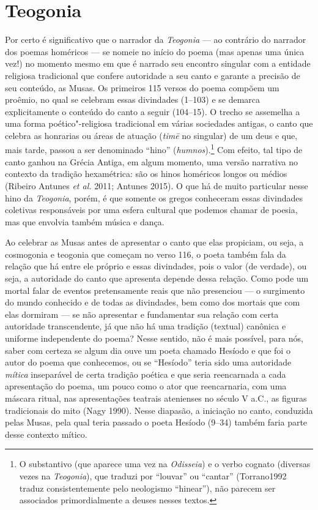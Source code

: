 \section*{Teogonia}


Por certo é significativo que o narrador da \emph{Teogonia} --- ao
contrário do narrador dos poemas homéricos --- se nomeie no início do
poema (mas apenas uma única vez!) no momento mesmo em que é narrado seu
encontro singular com a entidade religiosa tradicional que confere
autoridade a seu canto e garante a precisão de seu conteúdo, as Musas.
Os primeiros 115 versos do poema compõem um proêmio, no qual se celebram
essas divindades (1--103) e se demarca explicitamente o conteúdo do canto
a seguir (104--15). O trecho se assemelha a uma forma poético"-religiosa
tradicional em várias sociedades antigas, o canto que celebra as
honrarias ou áreas de atuação (\emph{timē} no singular) de um deus e
que, mais tarde, passou a ser denominado ``hino''
(\emph{humnos}).\footnote{O substantivo (que aparece uma vez na
  \emph{Odisseia}) e o verbo cognato (diversas vezes na
  \emph{Teogonia}), que traduzi por ``louvar'' ou ``cantar''
  (Torrano1992 traduz consistentemente pelo neologismo ``hinear''), não
  parecem ser associados primordialmente a deuses nesses textos.} Com
efeito, tal tipo de canto ganhou na Grécia Antiga, em algum momento, uma
versão narrativa no contexto da tradição hexamétrica: são os hinos
homéricos longos ou médios (Ribeiro Antunes \emph{et al.} 2011; Antunes
2015). O que há de muito particular nesse hino da \emph{Teogonia},
porém, é que somente os gregos conheceram essas divindades coletivas
responsáveis por uma esfera cultural que podemos chamar de poesia, mas
que envolvia também música e dança.

Ao celebrar as Musas antes de apresentar o canto que elas propiciam, ou
seja, a cosmogonia e teogonia que começam no verso 116, o poeta também
fala da relação que há entre ele próprio e essas divindades, pois o
valor (de verdade), ou seja, a autoridade do canto que apresenta depende
dessa relação. Como pode um mortal falar de eventos pretensamente reais
que não presenciou --- o surgimento do mundo conhecido e de todas as
divindades, bem como dos mortais que com elas dormiram --- se não
apresentar e fundamentar sua relação com certa autoridade transcendente,
já que não há uma tradição (textual) canônica e uniforme independente do
poema? Nesse sentido, não é mais possível, para nós, saber com certeza
se algum dia ouve um poeta chamado Hesíodo e que foi o autor do poema
que conhecemos, ou se ``Hesíodo'' teria sido uma autoridade
\emph{mítica} inseparável de certa tradição poética e que seria
reencarnada a cada apresentação do poema, um pouco como o ator que
reencarnaria, com uma máscara ritual, nas apresentações teatrais
atenienses no século V a.C., as figuras tradicionais do mito (Nagy
1990). Nesse diapasão, a iniciação no canto, conduzida pelas Musas, pela
qual teria passado o poeta Hesíodo (9--34) também faria parte desse
contexto mítico.

